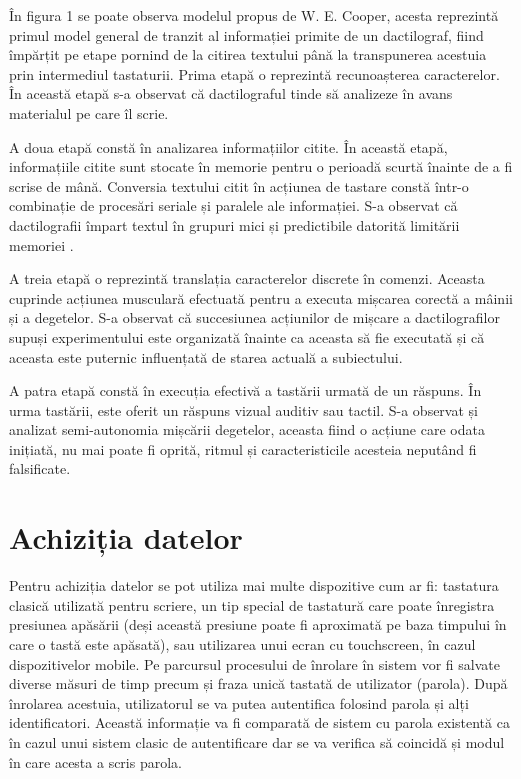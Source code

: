 \documentclass[9pt,shortpaper,twoside,web]{ieeecolor}
\begin{document}
	În figura 1 se poate observa modelul propus de W. E. Cooper, acesta reprezintă primul model general de tranzit al informației primite de un dactilograf, fiind împărțit pe etape pornind de la citirea textului până la transpunerea acestuia prin intermediul tastaturii. Prima etapă o reprezintă recunoașterea caracterelor. În această etapă s-a observat că dactilograful tinde să analizeze în avans materialul pe care îl scrie.


	A doua etapă constă în analizarea informațiilor citite. În această etapă, informațiile citite sunt stocate în memorie pentru o perioadă scurtă înainte de a fi scrise de mână. Conversia textului citit în acțiunea de tastare constă într-o combinație de procesări seriale și paralele ale informației. S-a observat că dactilografii împart textul în grupuri mici și predictibile datorită limitării memoriei \cite{b6}.

	A treia etapă o reprezintă translația caracterelor discrete în comenzi. Aceasta cuprinde acțiunea musculară efectuată pentru a executa mișcarea corectă a mâinii și a degetelor. S-a observat că succesiunea acțiunilor de mișcare a dactilografilor supuși experimentului este organizată înainte ca aceasta să fie executată și că aceasta este puternic influențată de starea actuală a subiectului. 
	
	A patra etapă constă în execuția efectivă a tastării urmată de un răspuns. În urma tastării, este oferit un răspuns vizual auditiv sau tactil. S-a observat și analizat semi-autonomia mișcării degetelor, aceasta fiind o acțiune care odata inițiată, nu mai poate fi oprită, ritmul și caracteristicile acesteia neputând fi falsificate. 



\section{Achiziția datelor}
	Pentru achiziția datelor se pot utiliza mai multe dispozitive cum ar fi: tastatura clasică utilizată pentru scriere, un tip special de tastatură care poate înregistra presiunea apăsării (deși această presiune poate fi aproximată pe baza timpului în care o tastă este apăsată), sau utilizarea unui ecran cu touchscreen, în cazul dispozitivelor mobile. Pe parcursul procesului de înrolare în sistem vor fi salvate diverse măsuri de timp precum și fraza unică tastată de utilizator (parola). După înrolarea acestuia, utilizatorul se va putea autentifica folosind parola și alți identificatori. Această informație va fi comparată de sistem cu parola existentă ca în cazul unui sistem clasic de autentificare dar se va verifica să coincidă și modul în care acesta a scris parola.
	
\end{document}
